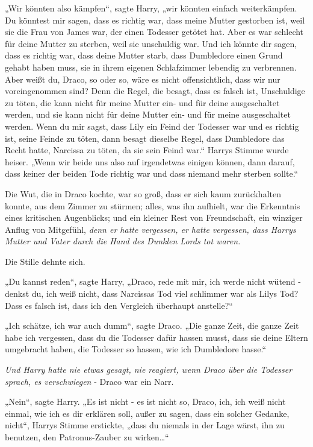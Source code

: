 {„Wir könnten also kämpfen“, sagte Harry, „wir könnten einfach weiterkämpfen. Du könntest mir sagen, dass es richtig war, dass meine Mutter gestorben ist, weil sie die Frau von James war, der einen Todesser getötet hat. Aber es war schlecht für deine Mutter zu sterben, weil sie unschuldig war. Und ich könnte dir sagen, dass es richtig war, dass deine Mutter starb, dass Dumbledore einen Grund gehabt haben muss, sie in ihrem eigenen Schlafzimmer lebendig zu verbrennen. Aber weißt du, Draco, so oder so, wäre es nicht offensichtlich, dass wir nur voreingenommen sind? Denn die Regel, die besagt, dass es falsch ist, Unschuldige zu töten, die kann nicht für meine Mutter ein- und für deine ausgeschaltet werden, und sie kann nicht für deine Mutter ein- und für meine ausgeschaltet werden. Wenn du mir sagst, dass Lily ein Feind der Todesser war und es richtig ist, seine Feinde zu töten, dann besagt dieselbe Regel, dass Dumbledore das Recht hatte, Narcissa zu töten, da sie sein Feind war.“ Harrys Stimme wurde heiser. „Wenn wir beide uns also auf irgendetwas einigen können, dann darauf, dass keiner der beiden Tode richtig war und dass niemand mehr sterben sollte.“

Die Wut, die in Draco kochte, war so groß, dass er sich kaum zurückhalten konnte, aus dem Zimmer zu stürmen; alles, was ihn aufhielt, war die Erkenntnis eines kritischen Augenblicks; und ein kleiner Rest von Freundschaft, ein winziger Anflug von Mitgefühl, \emph{denn er hatte vergessen, er hatte vergessen, dass Harrys Mutter und Vater durch die Hand des Dunklen Lords tot waren.}

Die Stille dehnte sich.

„Du kannst reden“, sagte Harry, „Draco, rede mit mir, ich werde nicht wütend - denkst du, ich weiß nicht, dass Narcissas Tod viel schlimmer war als Lilys Tod? Dass es falsch ist, dass ich den Vergleich überhaupt anstelle?“

„Ich schätze, ich war auch dumm“, sagte Draco. „Die ganze Zeit, die ganze Zeit habe ich vergessen, dass du die Todesser dafür hassen musst, dass sie deine Eltern umgebracht haben, die Todesser so hassen, wie ich Dumbledore hasse.“

\emph{Und Harry hatte nie etwas gesagt, nie reagiert, wenn Draco über die Todesser sprach, es verschwiegen} - Draco war ein Narr.

„Nein“, sagte Harry. „Es ist nicht - es ist nicht so, Draco, ich, ich weiß nicht einmal, wie ich es dir erklären soll, außer zu sagen, dass ein solcher Gedanke, nicht“, Harrys Stimme erstickte, „dass du niemals in der Lage wärst, ihn zu benutzen, den Patronus-Zauber zu wirken…“

}
